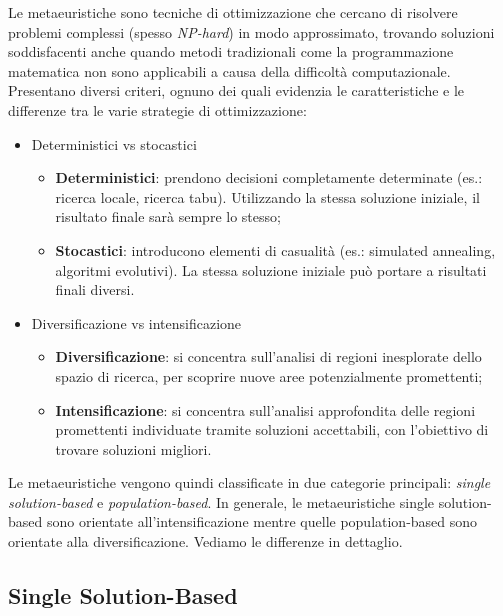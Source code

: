Le metaeuristiche sono tecniche di ottimizzazione che cercano di risolvere problemi complessi (spesso \emph{NP-hard}\glsfirstoccur) in modo approssimato, trovando soluzioni soddisfacenti anche quando metodi tradizionali come la programmazione matematica non sono applicabili a causa della difficoltà computazionale. Presentano diversi criteri, ognuno dei quali evidenzia le caratteristiche e le differenze tra le varie strategie di ottimizzazione:
\begin{itemize}
    \item Deterministici vs stocastici
    \begin{itemize}
        \item \textbf{Deterministici}: prendono decisioni completamente determinate (es.: ricerca locale, ricerca tabu). Utilizzando la stessa soluzione iniziale, il risultato finale sarà sempre lo stesso;
        \item \textbf{Stocastici}: introducono elementi di casualità (es.: simulated annealing, algoritmi evolutivi). La stessa soluzione iniziale può portare a risultati finali diversi.
    \end{itemize}
     
    \item Diversificazione vs intensificazione
    \begin{itemize}
        \item \textbf{Diversificazione}: si concentra sull'analisi di regioni inesplorate dello spazio di ricerca, per scoprire nuove aree potenzialmente promettenti;
        \item \textbf{Intensificazione}: si concentra sull'analisi approfondita delle regioni promettenti individuate tramite soluzioni accettabili, con l'obiettivo di trovare soluzioni migliori.
    \end{itemize}
\end{itemize}

Le metaeuristiche vengono quindi classificate in due categorie principali: \emph{single solution-based} e \emph{population-based}. In generale, le metaeuristiche single solution-based sono orientate all'intensificazione mentre quelle population-based sono orientate alla diversificazione.
Vediamo le differenze in dettaglio.

\subsection{Single Solution-Based} \hypertarget{ssb}{}

